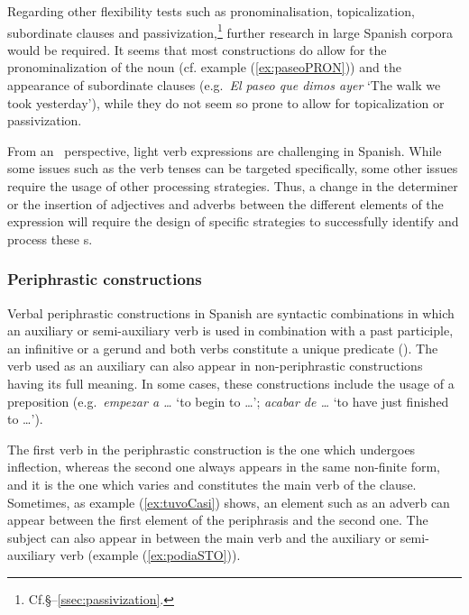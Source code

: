 \documentclass[output=paper]{langsci/langscibook}
\begin{document}
Regarding other flexibility tests such as pronominalisation, topicalization, subordinate clauses and passivization,\footnote{Cf.\@ §--\ref{ssec:passivization}.} further research in large Spanish corpora would be required.
It seems that most constructions do allow for the pronominalization of the noun (cf. example (\ref{ex:paseoPRON})) and the appearance of subordinate clauses (e.g.\ \textit{El paseo que dimos ayer} `The walk we took yesterday'), while they do not seem so prone to allow for topicalization or passivization. 

From an \nlp\ perspective, light verb expressions are challenging in Spanish.
While some issues such as the verb tenses can be targeted specifically, some other issues require the usage of other processing strategies.
Thus, a change in the determiner or the insertion of adjectives and adverbs between the different elements of the expression will require the design of specific strategies to successfully identify and process these \mwe s.


\subsubsection{Periphrastic constructions}
\label{sssec:periphrasis}

Verbal periphrastic constructions in Spanish are syntactic combinations in which an auxiliary or semi-auxiliary verb is used in combination with a past participle, an infinitive or a gerund and both verbs constitute a unique predicate (\citealt[529]{RAE:2010}).
The verb used as an auxiliary can also appear in non-periphrastic constructions having its full meaning.
In some cases, these constructions include the usage of a preposition (e.g.\ \textit{empezar a \ldots} `to begin to \ldots'; \textit{acabar de \ldots} `to have just finished to \ldots').

The first verb in the periphrastic construction is the one which undergoes inflection, whereas the second one always appears in the same non-finite form, and it is the one which varies and constitutes the main verb of the clause.
Sometimes, as example (\ref{ex:tuvoCasi}) shows, an element such as an adverb can appear between the first element of the periphrasis and the second one.
The subject can also appear in between the main verb and the auxiliary or semi-auxiliary verb (example (\ref{ex:podiaSTO})).
\end{document}
